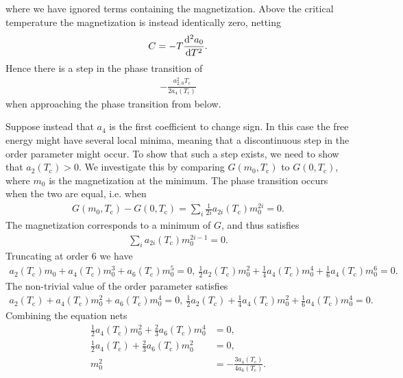 where we have ignored terms containing the magnetization. Above the critical temperature the magnetization is instead identically zero, netting
\begin{align*}
	C = -T\dv[2]{a_{0}}{T}.
\end{align*}
Hence there is a step in the phase transition of
\begin{align*}
	-\frac{a_{2, 0}^{2}T_{\text{c}}}{2a_{4}(T_{\text{c}})}
\end{align*}
when approaching the phase transition from below.

Suppose instead that $a_{4}$ is the first coefficient to change sign. In this case the free energy might have several local minima, meaning that a discontinuous step in the order parameter might occur. To show that such a step exists, we need to show that $a_{2}(T_{\text{c}}) > 0$. We investigate this by comparing $G(m_{0}, T_{\text{c}})$ to $G(0, T_{\text{c}})$, where $m_{0}$ is the magnetization at the minimum. The phase transition occurs when the two are equal, i.e. when
\begin{align*}
	G(m_{0}, T_{\text{c}}) - G(0, T_{\text{c}}) = \sum\limits_{i}\frac{1}{2i}a_{2i}(T_{\text{c}})m_{0}^{2i} = 0.
\end{align*}
The magnetization corresponds to a minimum of $G$, and thus satisfies
\begin{align*}
	\sum\limits_{i}a_{2i}(T_{\text{c}})m_{0}^{2i - 1} = 0.
\end{align*}
Truncating at order $6$ we have
\begin{align*}
	a_{2}(T_{\text{c}})m_{0} + a_{4}(T_{\text{c}})m_{0}^{3} + a_{6}(T_{\text{c}})m_{0}^{5} = 0,\ \frac{1}{2}a_{2}(T_{\text{c}})m_{0}^{2} + \frac{1}{4}a_{4}(T_{\text{c}})m_{0}^{4} + \frac{1}{6}a_{4}(T_{\text{c}})m_{0}^{6} = 0.
\end{align*}
The non-trivial value of the order parameter satisfies
\begin{align*}
	a_{2}(T_{\text{c}}) + a_{4}(T_{\text{c}})m_{0}^{2} + a_{6}(T_{\text{c}})m_{0}^{4} = 0,\ \frac{1}{2}a_{2}(T_{\text{c}}) + \frac{1}{4}a_{4}(T_{\text{c}})m_{0}^{2} + \frac{1}{6}a_{4}(T_{\text{c}})m_{0}^{4} = 0.
\end{align*}
Combining the equation nets
\begin{align*}
	\frac{1}{2}a_{4}(T_{\text{c}})m_{0}^{2} + \frac{2}{3}a_{6}(T_{\text{c}})m_{0}^{4} &= 0, \\
	\frac{1}{2}a_{4}(T_{\text{c}}) + \frac{2}{3}a_{6}(T_{\text{c}})m_{0}^{2}          &= 0, \\
	m_{0}^{2}                                                                         &= -\frac{3a_{4}(T_{\text{c}})}{4a_{6}(T_{\text{c}})}.
\end{align*}
